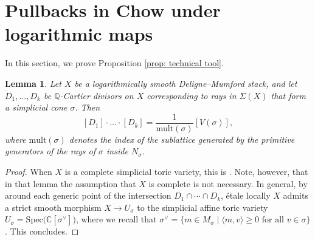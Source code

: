 \documentclass{article}
\newtheorem{lemma}[definition]{Lemma}
\begin{document}
\section{Pullbacks in Chow under logarithmic maps}

In this section, we prove Proposition \ref{prop: technical tool}.




\begin{lemma}
    Let $X$ be a logarithmically smooth Deligne--Mumford stack, and let 
    $D_1,\ldots,D_k$ be $\mathbb{Q}$-Cartier divisors on $X$ corresponding to rays in $\Sigma(X)$ that form a simplicial cone $\sigma$.
    Then
    \[
    [D_1]\cdot \ldots \cdot [D_k]
    = \frac{1}{\mathrm{mult}(\sigma)} [V(\sigma)],
    \]
    where $\mathrm{mult}(\sigma)$ denotes the index of the sublattice generated by the primitive generators of the rays of $\sigma$ inside $ N_\sigma$.
\end{lemma}

\begin{proof}
    When $X$ is a complete simplicial toric variety, this is \cite[Lemma~12.5.2]{CLS}. Note, however, that in that lemma the assumption that $X$ is complete is not necessary. In general, by \cite[Corollary 3.3.4]{Ogus} around each generic point of the intersection $D_1 \cap \cdots \cap D_k$, étale locally $X$ admits a strict smooth morphism
    $
    X \to U_\sigma
    $
    to the simplicial affine toric variety
    $
    U_\sigma = \mathrm{Spec}\big(\mathbb{C}[\sigma^\vee]\big)
    $, where we recall that $\sigma^\vee = \{ m \in M_\sigma \mid \langle m, v \rangle \ge 0 \text{ for all } v \in \sigma \}$. This concludes.
\end{proof}
\end{document}
